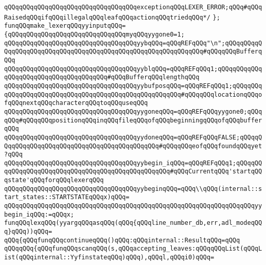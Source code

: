 \verb|qQQqqQQqqQQqqQQqqQQqqQQqqQQqqQQqqQQqexceptionqQQqLEXER_ERROR;qQQq#qQQqRaisedqQQqifqQQqillegalqQQqleafqQQqactionqQQqtriedqQQq*/|\newline
\verb|};|\newline
\newline
\verb|funqQQqmake_lexerqQQqyyinputqQQq=|\newline
\verb|{qQQqqQQqqQQqqQQqqQQqqQQqqQQqqQQqmyqQQqyygone0=1;|\newline
\verb|qQQqqQQqqQQqqQQqqQQqqQQqqQQqqQQqqQQqyybqQQq=qQQqREFqQQq"\n";qQQqqQQqqQQqqQQqqQQqqQQqqQQqqQQqqQQqqQQqqQQqqQQqqQQqqQQqqQQqqQQq#qQQqqQQqBufferqQQq|\newline
\verb|qQQqqQQqqQQqqQQqqQQqqQQqqQQqqQQqqQQqyyblqQQq=qQQqREFqQQq1;qQQqqQQqqQQqqQQqqQQqqQQqqQQqqQQqqQQqqQQq#qQQqBufferqQQqlengthqQQq|\newline
\verb|qQQqqQQqqQQqqQQqqQQqqQQqqQQqqQQqqQQqyybufposqQQq=qQQqREFqQQq1;qQQqqQQqqQQqqQQqqQQqqQQqqQQqqQQqqQQqqQQqqQQqqQQqqQQqqQQq#qQQqqQQqlocationqQQqofqQQqnextqQQqcharacterqQQqtoqQQquseqQQq|\newline
\verb|qQQqqQQqqQQqqQQqqQQqqQQqqQQqqQQqqQQqyygoneqQQq=qQQqREFqQQqyygone0;qQQqqQQq#qQQqqQQqpositionqQQqinqQQqfileqQQqofqQQqbeginningqQQqofqQQqbufferqQQq|\newline
\verb|qQQqqQQqqQQqqQQqqQQqqQQqqQQqqQQqqQQqyydoneqQQq=qQQqREFqQQqFALSE;qQQqqQQqqQQqqQQqqQQqqQQqqQQqqQQqqQQqqQQqqQQqqQQq#qQQqqQQqeofqQQqfoundqQQqyet?qQQq|\newline
\verb|qQQqqQQqqQQqqQQqqQQqqQQqqQQqqQQqqQQqyybegin_iqQQq=qQQqREFqQQq1;qQQqqQQqqQQqqQQqqQQqqQQqqQQqqQQqqQQqqQQqqQQqqQQqqQQq#qQQqCurrentqQQq'startqQQqstate'qQQqforqQQqlexerqQQq|\newline
\newline
\verb|qQQqqQQqqQQqqQQqqQQqqQQqqQQqqQQqqQQqyybeginqQQq=qQQq\\qQQq(internal::start_states::STARTSTATEqQQqx)qQQq=|\newline
\verb|qQQqqQQqqQQqqQQqqQQqqQQqqQQqqQQqqQQqqQQqqQQqqQQqqQQqqQQqqQQqqQQqqQQqyybegin_iqQQq:=qQQqx;|\newline
\newline
\verb|funqQQqlexqQQq(yyargqQQqasqQQq(qQQq{qQQqline_number_db,err,adl_modeqQQq}qQQq))qQQq=|\newline
\verb|qQQq{qQQqfunqQQqcontinueqQQq()qQQq:qQQqinternal::ResultqQQq=qQQq|\newline
\verb|qQQqqQQq{qQQqfunqQQqscanqQQq(s,qQQqaccepting_leaves:qQQqqQQqList(qQQqList(qQQqinternal::YyfinstateqQQq)qQQq),qQQql,qQQqi0)qQQq=|\newline
